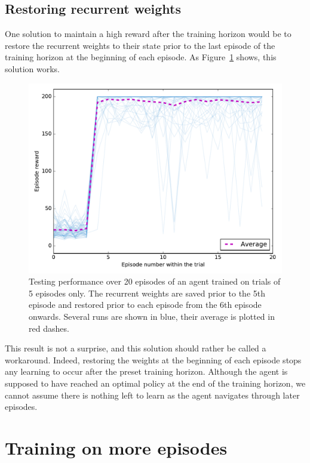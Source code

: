 \subsection{Restoring recurrent weights}
One solution to maintain a high reward after the training horizon would be 
to restore the recurrent weights to their state prior to the last episode of 
the training horizon at the beginning of each episode. As 
Figure~\ref{fig:horizon_5_20_restoring} shows, this solution works.\\

\begin{figure}
	\centering
	\includegraphics[width=0.8\linewidth]{fig/horizon_5_20_restoring.pdf}
	\caption{Testing performance over 20 episodes of an agent trained on 
	trials of 5 episodes only. The recurrent weights are saved prior to 
	the 5th episode and restored prior to each episode from the 6th episode
	onwards. Several runs are shown in blue, their average is plotted in
	red dashes.}
	\label{fig:horizon_5_20_restoring}
\end{figure}

This result is not a surprise, and this solution should rather be called a 
workaround. Indeed, restoring the weights at the beginning of each episode
stops any learning to occur after the preset training horizon. Although the
agent is supposed to have reached an optimal policy at the end of the training
horizon, we cannot assume there is nothing left to learn as the agent navigates
through later episodes.

\section{Training on more episodes}

